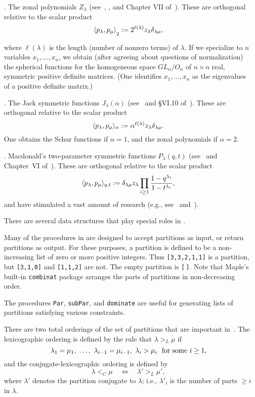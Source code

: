 . The zonal polynomials $Z_\lambda$ (see~\cite{4}, \cite{12}, and Chapter
VII of~\cite{7}). These are orthogonal relative to the scalar product
$$
\langle p_\lambda,p_\mu\rangle_{\strut2}
  :=2^{\ell(\lambda)}z_\lambda\delta_{\lambda\mu},
$$
where $\ell(\lambda)$ is the length (number of nonzero terms) of $\lambda$.
If we specialize to $n$ variables $x_1,\ldots,x_n$, we obtain (after
agreeing about questions of normalization) the spherical functions for
the homogeneous space $GL_n/O_n$ of $n\times n$ real, symmetric positive
definite matrices. (One identifies $x_1,\ldots,x_n$ as the eigenvalues of
a positive definite matrix.)

. The Jack symmetric functions $J_\lambda(\alpha)$ (see~\cite{10} and
\S VI.10 of~\cite{7}). These are orthogonal relative to the scalar product
$$
\langle p_\lambda,p_\mu\rangle_\alpha:=
  \alpha^{\ell(\lambda)}z_\lambda\delta_{\lambda\mu}.
$$
One obtains the Schur functions if $\alpha=1$, and the
zonal polynomials if $\alpha=2$.

. Macdonald's two-parameter symmetric functions $P_\lambda(q,t)$
(see~\cite{8} and Chapter~VI of~\cite{7}). These are orthogonal relative
to the scalar product
$$
\langle p_\lambda,p_\mu\rangle_{q,t}:=\delta_{\lambda\mu}z_\lambda
  \prod_{i\ge1}{1-q^{\lambda_i}\over 1-t^{\lambda_i}},
$$
and have stimulated a vast amount of research (e.g., see~\cite{2}
and~\cite{3}).

There are several data structures that play special roles in \SF.

Many of the procedures in \SF{} are designed to accept partitions as
input, or return partitions as output. For these purposes, a partition
is defined to be a non-increasing list of zero or more positive integers.
Thus {\tt [3,3,2,1,1]} is a partition, but {\tt [3,1,0]} and {\tt [1,1,2]}
are not. The empty partition is {\tt [$\,$]}. Note that Maple's built-in
{\tt combinat} package arranges the parts of partitions in
non-decreasing order.

The procedures {\tt Par}, {\tt subPar}, and {\tt dominate} are useful for
generating lists of partitions satisfying various constraints.

There are two total orderings of the set of partitions that are
important in~\SF. The lexicographic ordering
is defined by the rule that $\lambda>_L\mu$ if
$$
\lambda_1=\mu_1,\ \ldots,\ \lambda_{i-1}=\mu_{i-1},
  \ \lambda_i>\mu_i\ \hbox{ for some $i\ge1$},
$$
and the conjugate-lexicographic ordering is defined by
$$
\lambda<_C\mu\quad\Leftrightarrow\quad\lambda'>_L\mu',
$$
where $\lambda'$ denotes the partition conjugate to $\lambda$;
i.e., $\lambda'_i$ is the number of parts $\ge i$ in $\lambda$.

